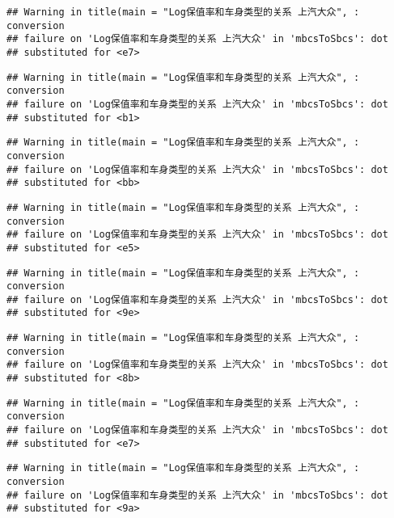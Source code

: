 \documentclass[]{article}
\begin{document}
\begin{verbatim}
## Warning in title(main = "Log保值率和车身类型的关系 上汽大众", : conversion
## failure on 'Log保值率和车身类型的关系 上汽大众' in 'mbcsToSbcs': dot
## substituted for <e7>
\end{verbatim}

\begin{verbatim}
## Warning in title(main = "Log保值率和车身类型的关系 上汽大众", : conversion
## failure on 'Log保值率和车身类型的关系 上汽大众' in 'mbcsToSbcs': dot
## substituted for <b1>
\end{verbatim}

\begin{verbatim}
## Warning in title(main = "Log保值率和车身类型的关系 上汽大众", : conversion
## failure on 'Log保值率和车身类型的关系 上汽大众' in 'mbcsToSbcs': dot
## substituted for <bb>
\end{verbatim}

\begin{verbatim}
## Warning in title(main = "Log保值率和车身类型的关系 上汽大众", : conversion
## failure on 'Log保值率和车身类型的关系 上汽大众' in 'mbcsToSbcs': dot
## substituted for <e5>
\end{verbatim}

\begin{verbatim}
## Warning in title(main = "Log保值率和车身类型的关系 上汽大众", : conversion
## failure on 'Log保值率和车身类型的关系 上汽大众' in 'mbcsToSbcs': dot
## substituted for <9e>
\end{verbatim}

\begin{verbatim}
## Warning in title(main = "Log保值率和车身类型的关系 上汽大众", : conversion
## failure on 'Log保值率和车身类型的关系 上汽大众' in 'mbcsToSbcs': dot
## substituted for <8b>
\end{verbatim}

\begin{verbatim}
## Warning in title(main = "Log保值率和车身类型的关系 上汽大众", : conversion
## failure on 'Log保值率和车身类型的关系 上汽大众' in 'mbcsToSbcs': dot
## substituted for <e7>
\end{verbatim}

\begin{verbatim}
## Warning in title(main = "Log保值率和车身类型的关系 上汽大众", : conversion
## failure on 'Log保值率和车身类型的关系 上汽大众' in 'mbcsToSbcs': dot
## substituted for <9a>
\end{verbatim}
\end{document}
